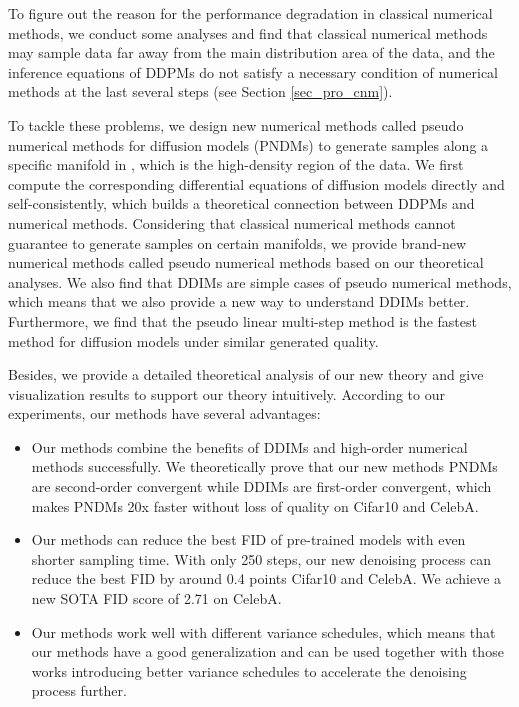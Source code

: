 \documentclass{article}
\begin{document}
To figure out the reason for the performance degradation in classical numerical methods, we conduct some analyses and find that classical numerical methods may sample data far away from the main distribution area of the data, and the inference equations of DDPMs do not satisfy a necessary condition of numerical methods at the last several steps (see Section \ref{sec_pro_cnm}).

To tackle these problems, we design new numerical methods called pseudo numerical methods for diffusion models (PNDMs) to generate samples along a specific manifold in , which is the high-density region of the data. We first compute the corresponding differential equations of diffusion models directly and self-consistently, which builds a theoretical connection between DDPMs and numerical methods. Considering that classical numerical methods cannot guarantee to generate samples on certain manifolds, we provide brand-new numerical methods called pseudo numerical methods based on our theoretical analyses. We also find that DDIMs are simple cases of pseudo numerical methods, which means that we also provide a new way to understand DDIMs better. Furthermore, we find that the pseudo linear multi-step method is the fastest method for diffusion models under similar generated quality.

Besides, we provide a detailed theoretical analysis of our new theory and give visualization results to support our theory intuitively. According to our experiments, our methods have several advantages:

\begin{itemize}[leftmargin=*]
   \item Our methods combine the benefits of DDIMs and high-order numerical methods successfully. We theoretically prove that our new methods PNDMs are second-order convergent while DDIMs are first-order convergent, which makes PNDMs 20x faster without loss of quality on Cifar10 and CelebA.
   \item Our methods can reduce the best FID of pre-trained models with even shorter sampling time. With only 250 steps, our new denoising process can reduce the best FID by around 0.4 points Cifar10 and CelebA. We achieve a new SOTA FID score of 2.71 on CelebA.
   \item Our methods work well with different variance schedules, which means that our methods have a good generalization and can be used together with those works introducing better variance schedules to accelerate the denoising process further.
\end{itemize}
\end{document}
